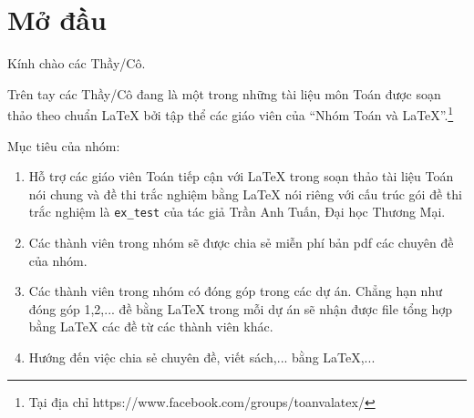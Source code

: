 \documentclass[12pt,a4paper,oneside]{book}
\renewcommand{\baselinestretch}{1.4}
\begin{document}
	
	\pagestyle{empty}
	\renewcommand{\headrulewidth}{0.4pt}
	
	\renewcommand{\baselinestretch}{1.3}
	
	
	\pagestyle{fancy}
	\chead{\empty}
	\rhead{\currfilename}
	\lfoot{\empty}
	\tableofcontents
		\chapter*{Mở đầu}
	Kính chào các Thầy/Cô.
	
	\vspace{0.6cm}
	
	\noindent Trên tay các Thầy/Cô đang là một trong những tài liệu môn Toán được soạn thảo theo chuẩn \LaTeX{} bởi tập thể các giáo viên của ``Nhóm Toán và LaTeX''.\footnote{Tại địa chỉ https://www.facebook.com/groups/toanvalatex/}
	
	\vspace{0.6cm}
	
	\noindent Mục tiêu của nhóm: 
	\begin{enumerate}
		\item Hỗ trợ các giáo viên Toán tiếp cận với \LaTeX{} trong soạn thảo tài liệu Toán nói chung và đề thi trắc nghiệm bằng \LaTeX{} nói riêng với cấu trúc gói đề thi trắc nghiệm là \texttt{ex\_test} của tác giả Trần Anh Tuấn, Đại học Thương Mại.
		\item Các thành viên trong nhóm sẽ được chia sẻ miễn phí bản pdf  các chuyên đề của nhóm.
		\item Các thành viên trong nhóm có đóng góp trong các dự án. Chẳng hạn như đóng góp 1,2,... đề bằng \LaTeX{} trong mỗi dự án sẽ nhận được file tổng hợp bằng \LaTeX{} các đề từ các thành viên khác.
		\item Hướng đến việc chia sẻ chuyên đề, viết sách,... bằng \LaTeX,...
	\end{enumerate}
\end{document}
